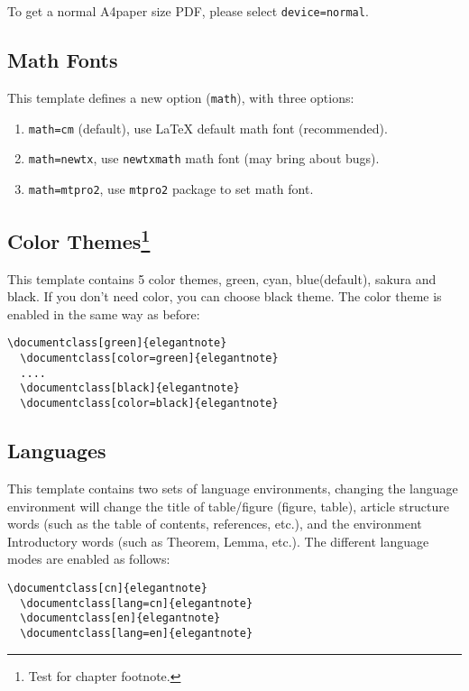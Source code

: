 \documentclass[en,hazy,screen,blue,14pt]{elegantnote}
\begin{document}
\begin{note}
To get a normal A4paper size PDF, please select \lstinline{device=normal}.
\end{note}

\subsection{Math Fonts}

This template defines a new option (\lstinline{math}), with three options:

\begin{enumerate}
  \item \lstinline{math=cm} (default), use \LaTeX{} default math font (recommended).
  \item \lstinline{math=newtx}, use \lstinline{newtxmath} math font (may bring about bugs).
  \item \lstinline{math=mtpro2}, use \lstinline{mtpro2} package to set math font.
\end{enumerate}


\subsection[Color Themes]{Color Themes\footnote{Test for chapter footnote.}}

This template contains 5 color themes, \textcolor{egreen}{green}, \textcolor{ecyan}{cyan}, \textcolor{eblue}{blue}(default), \textcolor{sakura}{sakura} and \textcolor{black}{black}. If you don't need color, you can choose black theme. The color theme is enabled in the same way as before:
\begin{lstlisting}[frame=none]  
  \documentclass[green]{elegantnote}
  \documentclass[color=green]{elegantnote}
  ....
  \documentclass[black]{elegantnote}
  \documentclass[color=black]{elegantnote}
\end{lstlisting}


\subsection{Languages}

This template contains two sets of language environments, changing the language environment will change the title of table/figure (figure, table), article structure words (such as the table of contents, references, etc.), and the environment Introductory words (such as Theorem, Lemma, etc.). The different language modes are enabled as follows:
\begin{lstlisting}[frame=none]  
  \documentclass[cn]{elegantnote}
  \documentclass[lang=cn]{elegantnote}
  \documentclass[en]{elegantnote}
  \documentclass[lang=en]{elegantnote}
\end{lstlisting}
\end{document}
